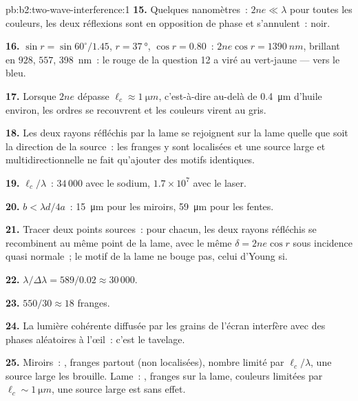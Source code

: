 \begin{solution}{pb:b2:two-wave-interference:1}
\textbf{15.} Quelques nanomètres~: $2ne \ll \lambda$ pour toutes les couleurs, les deux
réflexions sont en opposition de phase et s'annulent~: noir.

\textbf{16.} $\sin r = \sin60^\circ/1.45$, $r = \qty{37}{\degree}$, $\cos r = 0.80$~: $2ne\cos r
= \qty{1390}{nm}$, brillant en $928$, $557$, \qty{398}{nm}~: le rouge de la question 12 a
viré au vert-jaune --- vers le bleu.

\textbf{17.} Lorsque $2ne$ dépasse $\ell_c \approx \qty{1}{\micro m}$, c'est-à-dire au-delà de
\qty{0.4}{\micro m} d'huile environ, les ordres se recouvrent et les couleurs virent au gris.

\textbf{18.} Les deux rayons réfléchis par la lame se rejoignent sur la lame
quelle que soit la direction de la source~: les franges y sont localisées et
une source large et multidirectionnelle ne fait qu'ajouter des motifs identiques.

\textbf{19.} $\ell_c/\lambda$~: $34\,000$ avec le sodium, $1.7 \times 10^7$ avec le laser.

\textbf{20.} $b < \lambda d/4a$~: \qty{15}{\micro m} pour les miroirs, \qty{59}{\micro m} pour
les fentes.

\textbf{21.} Tracer deux points sources~: pour chacun, les deux rayons réfléchis
se recombinent au même point de la lame, avec le même $\delta = 2ne\cos r$
sous incidence quasi normale~; le motif de la lame ne bouge pas, celui d'Young si.

\textbf{22.} $\lambda/\Delta\lambda = 589/0.02 \approx 30\,000$.

\textbf{23.} $550/30 \approx 18$ franges.

\textbf{24.} La lumière cohérente diffusée par les grains de l'écran interfère
avec des phases aléatoires à l'œil~: c'est le tavelage.

\textbf{25.} Miroirs~: , franges partout
(non localisées), nombre limité par $\ell_c/\lambda$, une source large les
brouille. Lame~: , franges sur la lame, couleurs
limitées par $\ell_c \sim \qty{1}{\micro m}$, une source large est sans effet.
\end{solution}
